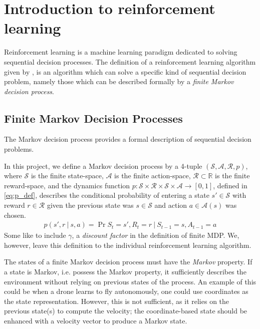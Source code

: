 \section{Introduction to reinforcement learning}
Reinforcement learning is a machine learning paradigm dedicated to solving sequential decision processes. The definition of a reinforcement learning algorithm given by \citet[chap. 3]{RLBook2018}, is an algorithm which can solve a specific kind of sequential decision problem, namely those which can be described formally by a \textit{finite Markov decision process}.


\subsection{Finite Markov Decision Processes}

The Markov decision process provides a formal description of sequential decision problems. 

In this project, we define a Markov decision process by a 4-tuple $(\mathcal{S},\mathcal{A},\mathcal{R}, p)$, where $\mathcal{S}$ is the finite state-space, $\mathcal{A}$ is the finite action-space, $\mathcal{R} \subset \mathbb{R}$ is the finite reward-space, and the dynamics function $p : \mathcal{S} \times \mathcal{R} \times \mathcal{S} \times \mathcal{A} \rightarrow [0,1]$, defined in \cref{eq:p_def}, describes the conditional probability of entering a state $s' \in \mathcal{S}$ with reward $r \in \mathcal{R}$ given the previous state was $s \in \mathcal{S}$ and action $a \in \mathcal{A}(s)$ was chosen.
\begin{align}
    \label{eq:p_def} p(s',r\ |\ s,a) = \Pr{S_t\!=\!s', R_t\!=\!r\ |\ S_{t-1}\!=\!s, A_{t-1}\!=\!a}
\end{align}
Some like to include $\gamma$, a \textit{discount factor} in the definition of finite MDP. 
We, however, leave this definition to the individual reinforcement learning algorithm.

The states of a finite Markov decision process must have the \emph{Markov} property. If a state is Markov, i.e. possess the Markov property, it sufficiently describes the environment without relying on previous states of the process. An example of this could be when a drone learns to fly autonomously, one could use coordinates as the state representation. However, this is not sufficient, as it relies on the previous state(s) to compute the velocity; the coordinate-based state should be enhanced with a velocity vector to produce a Markov state.

